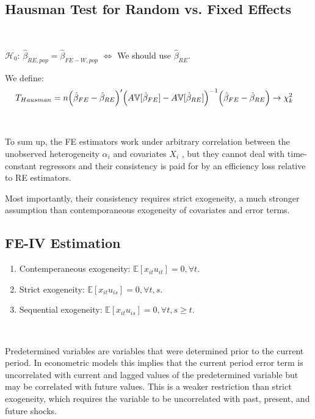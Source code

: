 \subsection{Hausman Test for Random vs. Fixed Effects}


\begin{theorem}\label{Hausman-test}
    \
    
    $\mathcal{H}_0$: $\hat{\beta}_{RE, pop} = \hat{\beta}_{FE-W, pop}$ $\Leftrightarrow$ We should use $\hat{\beta}_{RE}$.

    We define:
    \begin{align*}
        T_{Hausman} &= n \Bigl(\hat{\beta}_{FE} - \hat{\beta}_{RE} \Bigr)^{\prime} \Bigl( A\mathbb{V}[\hat{\beta}_{FE}] - A\mathbb{V}[\hat{\beta}_{RE}] \Bigr)^{-1} \Bigl(\hat{\beta}_{FE} - \hat{\beta}_{RE}\Bigr) \rightarrow \chi_k^2
    \end{align*}
\end{theorem}

\begin{note}
    \

    To sum up, the FE estimators work under arbitrary correlation between the unobserved
heterogeneity $\alpha_i$ and covariates $X_i$ , but they cannot deal with time-constant regressors and
their consistency is paid for by an efficiency loss relative to RE estimators.

    Most importantly, their consistency requires strict exogeneity, 
    a much stronger assumption than contemporaneous exogeneity of covariates and error terms.
\end{note}

\subsection{FE-IV Estimation}

\begin{enumerate}
    \item Contemperaneous exogeneity: $\mathbb{E}[x_{it} u_{it}] = 0, \forall t.$
    \item Strict exogeneity: $\mathbb{E}[x_{it} u_{is}] = 0, \forall t, s.$
    \item Sequential exogeneity: $\mathbb{E}[x_{it} u_{is}] = 0, \forall t, s \geq t.$
\end{enumerate}
\begin{definition}
    \

    Predetermined variables are variables that were determined prior to the current period. 
    In econometric models this implies that the current period error term is 
    uncorrelated with current and lagged values of the predetermined variable 
    but may be correlated with future values. 
    This is a weaker restriction than strict exogeneity, 
    which requires the variable to be uncorrelated with past, present, and future shocks.
\end{definition}

